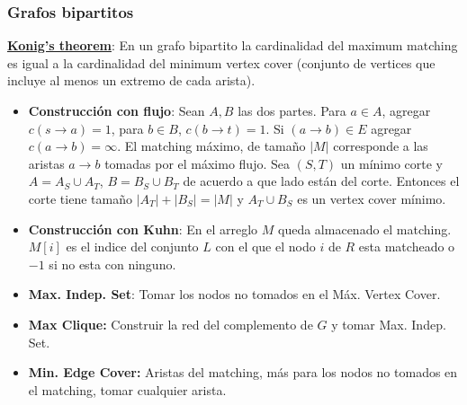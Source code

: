 \subsubsection{Grafos bipartitos}
\ul{\textbf{Konig's theorem}}: En un grafo bipartito la cardinalidad del maximum matching es igual a la cardinalidad del minimum vertex cover (conjunto de vertices que incluye al menos un extremo de cada arista).
\begin{itemize}
    \item \textbf{Construcción con flujo}: Sean $A, B$ las dos partes. Para $a \in A$, agregar $c(s\to a) = 1$, para $b \in B$, $c(b\to t) = 1$.
    Si $(a\to b) \in E$ agregar $c(a\to b) = \infty$. El matching máximo, de tamaño $|M|$ corresponde a las aristas $a \to b$ tomadas por el máximo flujo. Sea $(S, T)$ un mínimo corte y $A = A_S \cup A_T$, $B = B_S \cup B_T$ de acuerdo a que lado están del corte. Entonces el corte tiene tamaño $|A_T| + |B_S| = |M|$ y $A_T \cup B_S$ es un vertex cover mínimo.
    \item \textbf{Construcción con Kuhn}: En el arreglo $M$ queda almacenado el matching. $M[i]$ es el indice del conjunto $L$ con el que el nodo $i$ de $R$ esta matcheado o $-1$ si no esta con ninguno.
        \item \textbf{Max. Indep. Set}: Tomar los nodos no tomados en el Máx. Vertex Cover.
\item \textbf{Max Clique:} Construir la red del complemento de $G$ y tomar Max. Indep. Set.
    \item \textbf{Min. Edge Cover:} Aristas del matching, más para los nodos no tomados en el matching, tomar cualquier arista.
\end{itemize}
